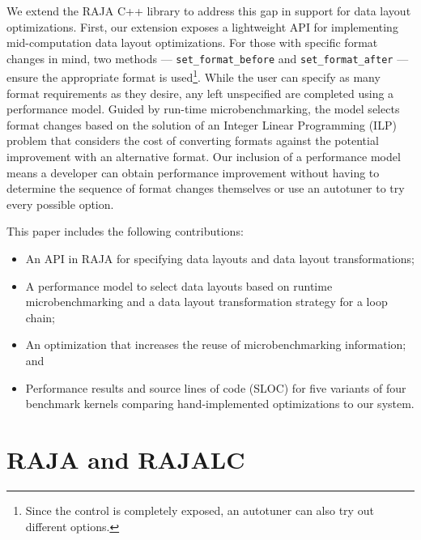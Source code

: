 \documentclass[sigconf]{acmart}
\begin{document}
We extend the RAJA C++ library to address this gap in support for data layout optimizations.
First, our extension exposes a lightweight API for implementing mid-computation data layout optimizations.
For those with specific format changes in mind, two methods --- \verb.set_format_before. and \verb.set_format_after. --- ensure the appropriate format is used\footnote{Since the control is completely exposed, an autotuner can also try out different options.}.
While the user can specify as many format requirements as they desire, any left unspecified are completed using a performance model.
Guided by run-time microbenchmarking, the model selects format changes based on the solution of an Integer Linear Programming (ILP) problem that considers the cost of converting formats against the potential improvement with an alternative format.
Our inclusion of a performance model means a developer can obtain performance improvement without having to determine the sequence of format changes themselves or use an autotuner to try every possible option.

This paper includes the following contributions:
\begin{itemize}
\item An API in RAJA for specifying data layouts and data layout transformations;
\item A performance model to select data layouts based on runtime microbenchmarking and a data layout transformation strategy for a loop chain;
\item An optimization that increases the reuse of microbenchmarking information; and
\item Performance results and source lines of code (SLOC) for five variants of four benchmark kernels comparing hand-implemented optimizations to our system.
\end{itemize} 


\section{RAJA and RAJALC}
\end{document}
